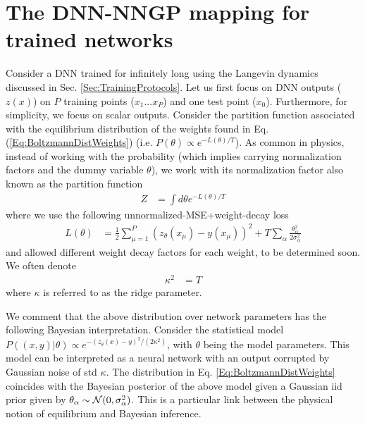 \section{The DNN-NNGP mapping for trained networks}
\label{Sec:NNGP_On_Data}
Consider a DNN trained for infinitely long using the Langevin dynamics discussed in Sec. \ref{Sec:TrainingProtocols}. Let us first focus on DNN outputs ($z(x)$) on $P$ training points ($x_1...x_P$) and one test point ($x_0$). Furthermore, for simplicity, we focus on scalar outputs. Consider the partition function associated with the equilibrium distribution of the weights found in Eq. (\ref{Eq:BoltzmannDistWeights}) (i.e. $P(\theta) \propto e^{-L(\theta)/T}$). As common in physics, instead of working with the probability (which implies carrying normalization factors and the dummy variable $\theta$), we work with its normalization factor also known as the partition function 
\begin{align}
Z &= \int d\theta e^{-L(\theta)/T}
\end{align}
where we use the following  unnormalized-MSE+weight-decay loss 
\begin{align}
L(\theta) &= \frac{1}{2}\sum_{\mu=1}^P (z_{\theta}(x_{\mu})-y(x_{\mu}))^2 + T \sum_{\alpha} \frac{\theta^2_{\alpha}}{2\sigma^2_{\alpha}}
\end{align}
and allowed different weight decay factors for each weight, to be determined soon. We often denote 
\begin{align}
\kappa^2 &= T
\end{align}
where $\kappa$ is referred to as the ridge parameter. 

We comment that the above distribution over network parameters has the following Bayesian interpretation. Consider the statistical model  $P((x,y)|\theta) \propto e^{-(z_{\theta}(x)-y)^2/(2\kappa^2)}$, with $\theta$ being the model parameters. This model can be interpreted as a neural network with an output corrupted by Gaussian noise of std $\kappa$. The distribution in Eq. \ref{Eq:BoltzmannDistWeights} coincides with the Bayesian posterior of the above model given a Gaussian iid prior given by $\theta_{\alpha} \sim {\cal N}(0,\sigma^2_{\alpha})$. This is a particular link between the physical notion of equilibrium and Bayesian inference. 

